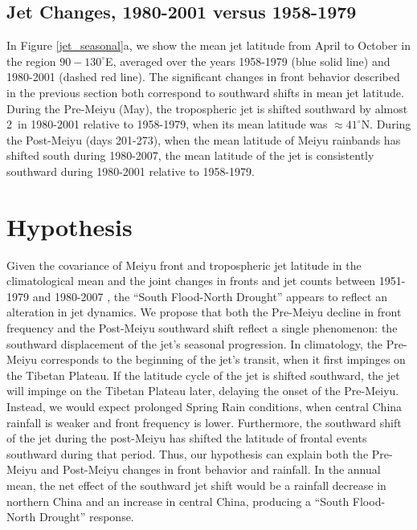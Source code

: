 \documentclass[draft,grl]{AGUTeX}
\begin{document}
\begin{article}
\subsection{Jet Changes, 1980-2001 versus 1958-1979}

	In Figure \ref{jet_seasonal}a, we show the mean jet latitude from April to October in the region $90-130^\circ$E, averaged over the years 1958-1979 (blue solid line) and 1980-2001 (dashed red line). The significant changes in front behavior described in the previous section both correspond to southward shifts in mean jet latitude. During the Pre-Meiyu (May), the tropospheric jet is shifted southward by almost 2\textdegree\ in 1980-2001 relative to 1958-1979, when its mean latitude was $\approx 41^\circ$N. During the Post-Meiyu (days 201-273), when the mean latitude of Meiyu rainbands has shifted south during 1980-2007, the mean latitude of the jet is consistently southward during 1980-2001 relative to 1958-1979.
	
	
\section{Hypothesis}

	Given the covariance of Meiyu front and tropospheric jet latitude in the climatological mean and the joint changes in fronts and jet counts between 1951-1979 and 1980-2007 , the ``South Flood-North Drought'' appears to reflect an alteration in jet dynamics. We propose that both the Pre-Meiyu decline in front frequency and the Post-Meiyu southward shift reflect a single phenomenon: the southward displacement of the jet's seasonal progression. In climatology, the Pre-Meiyu corresponds to the beginning of the jet's transit, when it first impinges on the Tibetan Plateau. If the latitude cycle of the jet is shifted southward, the jet will impinge on the Tibetan Plateau later, delaying the onset of the Pre-Meiyu. Instead, we would expect prolonged Spring Rain conditions, when central China rainfall is weaker and front frequency is lower. Furthermore, the southward shift of the jet during the post-Meiyu has shifted the latitude of frontal events southward during that period. Thus, our hypothesis can explain both the Pre-Meiyu and Post-Meiyu changes in front behavior and rainfall. In the annual mean, the net effect of the southward jet shift would be a rainfall decrease in northern China and an increase in central China, producing a ``South Flood-North Drought'' response.
	

\end{article}
\end{document}
